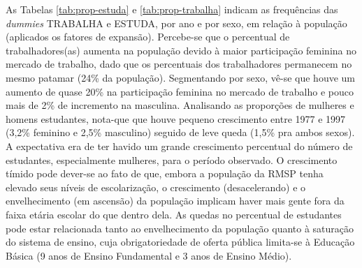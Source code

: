 
As Tabelas \ref{tab:prop-estuda} e \ref{tab:prop-trabalha} indicam as frequências das \textit{dummies} TRABALHA e ESTUDA, por ano e por sexo, em relação à população (aplicados os fatores de expansão).
Percebe-se que o percentual de trabalhadores(as) aumenta na população devido à maior participação feminina no mercado de trabalho, dado que os percentuais dos trabalhadores permanecem no mesmo patamar (24\% da população). Segmentando por sexo, vê-se que houve um aumento de quase 20\% na participação feminina no mercado de trabalho e pouco mais de 2\% de incremento na masculina.
Analisando as proporções de mulheres e homens estudantes, nota-que que houve pequeno crescimento entre 1977 e 1997 (3,2\% feminino e 2,5\% masculino) seguido de leve queda (1,5\% pra ambos sexos). A expectativa era de ter havido um grande crescimento percentual do número de estudantes, especialmente mulheres, para o período observado. O crescimento tímido pode dever-se ao fato de que, embora a população da RMSP tenha elevado seus níveis de escolarização, o crescimento (desacelerando) e o envelhecimento (em ascensão) da população implicam haver mais gente fora da faixa etária escolar do que dentro dela. As quedas no percentual de estudantes pode estar relacionada tanto ao envelhecimento da população quanto à saturação do sistema de ensino, cuja obrigatoriedade de oferta pública limita-se à Educação Básica (9 anos de Ensino Fundamental e 3 anos de Ensino Médio). 


\begin{table}[htb]

\end{table}


